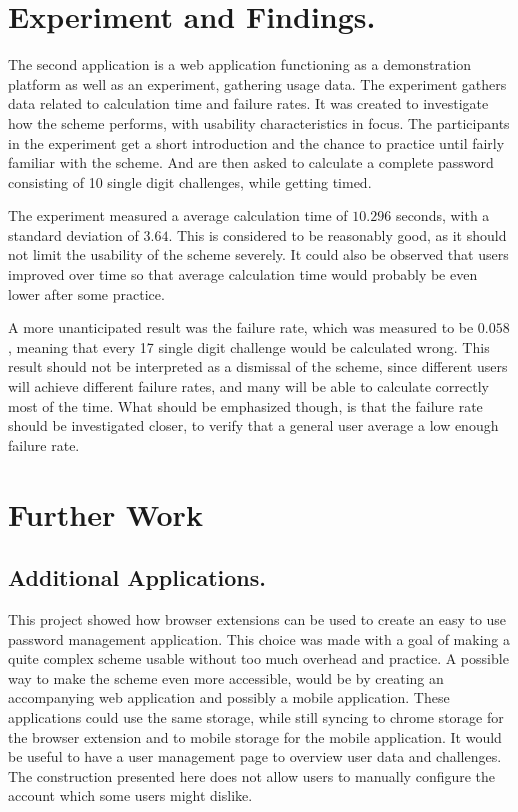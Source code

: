 \section{Experiment and Findings.}
\par The second application is a web application functioning as a demonstration platform as well as an experiment, gathering usage data. The experiment gathers data related to calculation time and failure rates. It was created to investigate how the scheme performs, with usability characteristics in focus. The participants in the experiment get a short introduction and the chance to practice until fairly familiar with the scheme. And are then asked to calculate a complete password consisting of 10 single digit challenges, while getting timed.
\par The experiment measured a average calculation time of $10.296$ seconds, with a standard deviation of $3.64$. This is considered to be reasonably good, as it should not limit the usability of the scheme severely. It could also be observed that users improved over time so that average calculation time would probably be even lower after some practice. 
\par A more unanticipated result was the failure rate, which was measured to be $0.058$, meaning that every 17 single digit challenge would be calculated wrong. This result should not be interpreted as a dismissal of the scheme, since different users will achieve different failure rates, and many will be able to calculate correctly most of the time. What should be emphasized though, is that the failure rate should be investigated closer, to verify that a general user average a low enough failure rate. 


\section{Further Work}

\subsection{Additional Applications.}
This project showed how browser extensions can be used to create an easy to use password management application. This choice was made with a goal of making a quite complex scheme usable without too much overhead and practice. A possible way to make the scheme even more accessible, would be by creating an accompanying web application and possibly a mobile application. These applications could use the same storage, while still syncing to chrome storage for the browser extension and to mobile storage for the mobile application. It would be useful to have a user management page to overview user data and challenges. The construction presented here does not allow users to manually configure the account which some users might dislike. 

